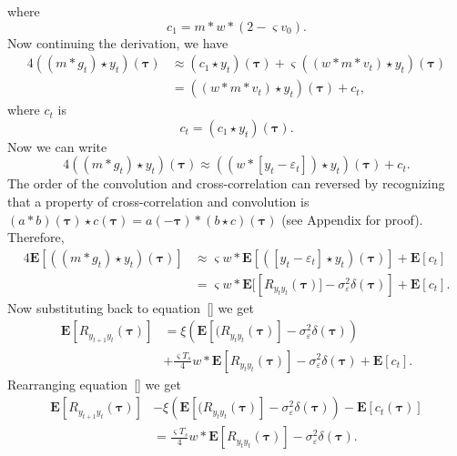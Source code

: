 \documentclass[conference,onecolumn]{IEEEtran}
\begin{document}
where
\begin{equation}
	c_1 = m\ast w\ast (2 - \varsigma v_0).
\end{equation}
Now continuing the derivation, we have
\begin{align}
4((m \ast g_t) \star y_t)(\boldsymbol\tau) &\approx (c_1 \star y_t)(\boldsymbol\tau) + \varsigma ((w \ast m\ast v_t) \star y_t)(\boldsymbol\tau) \\
&= (( w \ast m\ast v_t ) \star y_t)(\boldsymbol\tau) + c_t,
\end{align}
where $c_t$ is 
\begin{equation}
	c_t = (c_1 \star y_t)(\boldsymbol\tau).
\end{equation}
Now we can write
\begin{equation}
4((m \ast g_t) \star y_t)(\boldsymbol\tau) \approx (( w \ast \left[y_t-\varepsilon_t \right] ) \star y_t)(\boldsymbol\tau) + c_t.
\end{equation}
The order of the convolution and cross-correlation can reversed by recognizing that a property of cross-correlation and convolution is $(a \ast b)(\boldsymbol\tau) \star c(\boldsymbol\tau) = a(-\boldsymbol\tau)\ast(b \star c)(\boldsymbol\tau)$ (see Appendix for proof). Therefore,
\begin{align}
4\mathbf{E}[((m \ast g_t) \star y_t)(\boldsymbol\tau)] &\approx \varsigma w \ast \mathbf{E}[(\left[y_t-\varepsilon_t \right]\star y_t ) (\boldsymbol\tau)] + \mathbf{E}[c_t] \\ 
&= \varsigma w \ast \mathbf{E}[\left[R_{y_ty_t}(\boldsymbol\tau)] - \sigma_{\varepsilon}^2 \delta(\boldsymbol\tau) \right] + \mathbf{E}[c_t].
\end{align}
Now substituting back to equation~\ref{} we get
\begin{align}
	\mathbf{E}[R_{y_{t+1}y_t}(\boldsymbol{\tau})] &= \xi\left(\mathbf{E}[ (R_{y_ty_t}(\boldsymbol{\tau})] - \sigma_{\varepsilon}^2 \delta(\boldsymbol{\tau})\right) \nonumber \\
	&+ \frac{\varsigma T_s}{4}w \ast \mathbf{E}\left[R_{y_ty_t}(\boldsymbol\tau)\right] - \sigma_{\varepsilon}^2 \delta(\boldsymbol\tau)  + \mathbf{E}\left[c_t\right].
\end{align}
Rearranging equation~\ref{} we get
\begin{align}
	\mathbf{E}[R_{y_{t+1}y_t}(\boldsymbol{\tau})] &- \xi\left(\mathbf{E}[ (R_{y_ty_t}(\boldsymbol{\tau})] - \sigma_{\varepsilon}^2 \delta(\boldsymbol{\tau})\right) - \mathbf{E}\left[c_t(\boldsymbol\tau)\right] \nonumber \\
	&= \frac{\varsigma T_s}{4}w \ast \mathbf{E}\left[R_{y_ty_t}(\boldsymbol\tau)\right] - \sigma_{\varepsilon}^2 \delta(\boldsymbol\tau).
\end{align}
\end{document}
